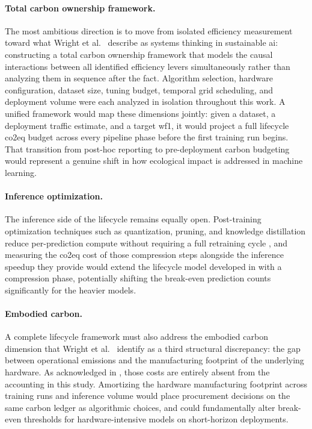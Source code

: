 \paragraph{Total carbon ownership framework.}
The most ambitious direction is to move from isolated efficiency measurement toward what Wright et al.\ \parencite{wrightEfficiencyNotEnough2025} describe as systems thinking in sustainable \gls{ai}: constructing a total carbon ownership framework that models the causal interactions between all identified efficiency levers simultaneously rather than analyzing them in sequence after the fact. Algorithm selection, hardware configuration, dataset size, tuning budget, temporal grid scheduling, and deployment volume were each analyzed in isolation throughout this work. A unified framework would map these dimensions jointly: given a dataset, a deployment traffic estimate, and a target \gls{wf1}, it would project a full lifecycle \gls{co2eq} budget across every pipeline phase before the first training run begins. That transition from post-hoc reporting to pre-deployment carbon budgeting would represent a genuine shift in how ecological impact is addressed in machine learning.

\paragraph{Inference optimization.}
The inference side of the lifecycle remains equally open. Post-training optimization techniques such as quantization, pruning, and knowledge distillation reduce per-prediction compute without requiring a full retraining cycle \cite{pattersonCarbonEmissionsLarge2021}, and measuring the \gls{co2eq} cost of those compression steps alongside the inference speedup they provide would extend the lifecycle model developed in  with a compression phase, potentially shifting the break-even prediction counts significantly for the heavier models.

\paragraph{Embodied carbon.}
A complete lifecycle framework must also address the embodied carbon dimension that Wright et al.\ \parencite{wrightEfficiencyNotEnough2025} identify as a third structural discrepancy: the gap between operational emissions and the manufacturing footprint of the underlying hardware. As acknowledged in , those costs are entirely absent from the accounting in this study. Amortizing the hardware manufacturing footprint across training runs and inference volume would place procurement decisions on the same carbon ledger as algorithmic choices, and could fundamentally alter break-even thresholds for hardware-intensive models on short-horizon deployments.

